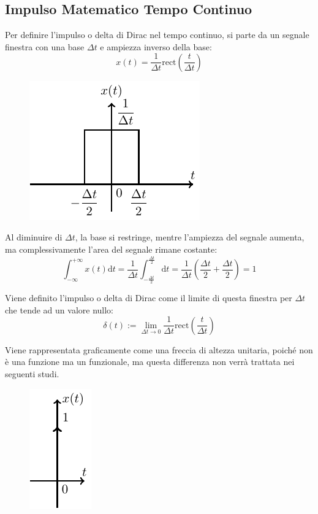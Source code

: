 \documentclass{article}
\newcommand{\rect}{\mathrm{rect}}
\newcommand{\df}{\mathrm{d}}
\numberwithin{equation}{subsection}
\begin{document}
\subsection{Impulso Matematico Tempo Continuo}

Per definire l'impulso o delta di Dirac nel tempo continuo, si parte da un segnale finestra con una base $\Delta t$ e ampiezza inverso della base:
\begin{equation*}
    x(t)=\displaystyle\frac{1}{\Delta t}\rect\left(\frac{t}{\Delta t}\right)
\end{equation*}

\begin{figure}[H]%
    \centering
    \includegraphics{impulso-finestra.pdf}%
\end{figure}

Al diminuire di $\Delta t$, la base si restringe, mentre l'ampiezza del segnale aumenta, ma complessivamente l'area del segnale rimane costante:
\begin{equation*}
    \displaystyle\int_{-\infty}^{+\infty}x(t)\df t=\frac{1}{\Delta t}\int_{-\frac{\Delta t}{2}}^{\frac{\Delta t}{2}}\df t=\frac{1}{\Delta t}\left(\frac{\Delta t}{2}+\frac{\Delta t}{2}\right)=1
\end{equation*}

Viene definito l'impulso o delta di Dirac come il limite di questa finestra per $\Delta t$ che tende ad un valore nullo:
\begin{equation}
    \delta(t):=\lim_{\Delta t\to0}\displaystyle\frac{1}{\Delta t}\rect\left(\frac{t}{\Delta t}\right)
\end{equation}

Viene rappresentata graficamente come una freccia di altezza unitaria, poiché non è una funzione ma un funzionale, ma questa differenza non verrà trattata nei seguenti 
studi.  
\begin{figure}[H]%
    \centering
    \includegraphics{impulso.pdf}%
\end{figure}
\end{document}

